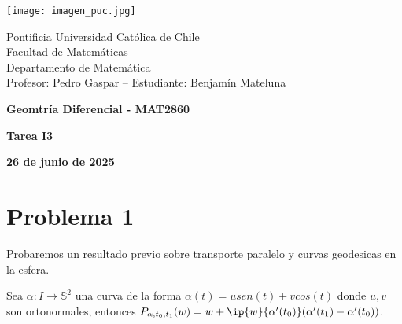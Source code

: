 \documentclass{article}
\begin{document}
\begin{minipage}{2.5cm}
    \texttt{[image: imagen\_puc.jpg]}
\end{minipage}
\begin{minipage}{14cm}
    {\sc Pontificia Universidad Católica de Chile\\
    Facultad de Matemáticas\\
    Departamento de Matemática\\
    Profesor: Pedro Gaspar -- Estudiante: Benjamín Mateluna}
\end{minipage}
\vspace{1ex}

{\centerline{\bf Geomtría Diferencial - MAT2860}
\centerline{\bf Tarea I3}}
\centerline{\bf 26 de junio de 2025}

\section*{Problema 1}
Probaremos un resultado previo sobre transporte paralelo y curvas geodesicas en la esfera.
\begin{lema}
    Sea $\alpha:I\to\mathbb{S}^{2}$ una curva de la forma $\alpha(t)=usen(t)+vcos(t)$ donde $u,v$ 
    son ortonormales, entonces $P_{\alpha,t_{0},t_{1}}(w)=w+\ip{w}{\alpha'(t_{0})}(\alpha'(t_{1})
    -\alpha'(t_{0}))$.
\end{lema}
\end{document}
